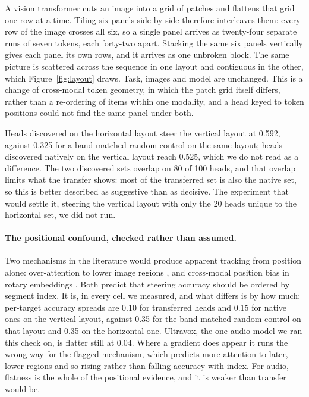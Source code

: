 \documentclass[11pt]{article}
\begin{document}
A vision transformer cuts an image into a grid of patches and flattens that grid
one row at a time. Tiling six panels side by side therefore interleaves them:
every row of the image crosses all six, so a single panel arrives as twenty-four
separate runs of seven tokens, each forty-two apart. Stacking the same six panels
vertically gives each panel its own rows, and it arrives as one unbroken block.
The same picture is scattered across the sequence in one layout and contiguous in
the other, which Figure~\ref{fig:layout} draws. Task, images and model are
unchanged. This is a change of cross-modal
token geometry, in which the patch grid itself differs, rather than a re-ordering
of items within one modality, and a head keyed to token positions could not find
the same panel under both.

Heads discovered on the horizontal layout steer the vertical layout at 0.592,
against 0.325 for a band-matched random control on the same layout; heads
discovered natively on the vertical layout reach 0.525, which we do not read as a
difference. The two discovered sets overlap on 80 of 100 heads, and that overlap
limits what the transfer shows: most of the transferred set is also the native
set, so this is better described as suggestive than as decisive. The experiment
that would settle it, steering the vertical layout with only the 20 heads unique
to the horizontal set, we did not run.

\paragraph{The positional confound, checked rather than assumed.}
Two mechanisms in the literature would produce apparent tracking from position
alone: over-attention to lower image regions \citep{lowerregion2025}, and
cross-modal position bias in rotary embeddings \citep{circlerope2025}. Both
predict that steering accuracy should be ordered by segment index. It is, in
every cell we measured, and what differs is by how much: per-target accuracy
spreads are 0.10 for transferred heads and 0.15 for native ones on the vertical
layout, against 0.35 for the band-matched random control on that layout and 0.35
on the horizontal one. Ultravox, the one audio model we ran this check on, is
flatter still at 0.04. Where a gradient does appear it runs the wrong way for the
flagged mechanism, which predicts more attention to later, lower regions and so
rising rather than falling accuracy with index. For audio, flatness is the whole
of the positional evidence, and it is weaker than transfer would be.
\end{document}
